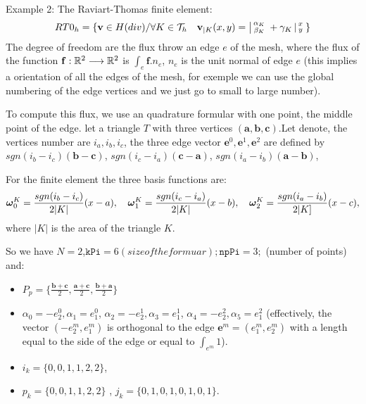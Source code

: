  Example 2: The Raviart-Thomas finite element: 
    \begin{equation}
         RT0_{h} = \{ \mathbf{v} \in H(div) / \forall K \in
         \mathcal{T}_{h} \quad  \mathbf{v}_{|K}(x,y) =
         \left|\begin{smallmatrix} \alpha_{K} \\ \beta_{K} \end{smallmatrix}\right. + \gamma_{K}\left|\begin{smallmatrix} x \\ y \end{smallmatrix}\right.  \}
         \label{eq:RT0-fe}
     \end{equation}
 The degree of freedom are the flux   throw an edge $e$ of the mesh, where the flux of
 the function $\mathbf{f} : \mathbb{R}^2 \longrightarrow \mathbb{R}^2 $ is $\int_{e} \mathbf{f}.n_{e}$,
 $n_{e}$ is the unit normal of edge $e$ (this implies a orientation of all  the edges of the mesh,
 for exemple we can use the global numbering of the edge vertices and we just go to small to large number).
 
 
  To compute this flux, we use an quadrature formular with one point, the middle point
  of the edge. let a triangle $T$ with three vertices $(\mathbf{a},\mathbf{b},\mathbf{c})$.Let denote, the  vertices number are  $i_{a},i_{b},i_{c}$, the three edge vector $\mathbf{e}^{0},\mathbf{e}^{1},\mathbf{e}^{2}$ are 
  defined by $ sgn(i_{b}-i_{c})(\mathbf{b}-\mathbf{c})$, $sgn(i_{c}-i_{a})(\mathbf{c}-\mathbf{a})$, $sgn(i_{a}-i_{b})(\mathbf{a}-\mathbf{b})$, 
  
  For the finite element the three basis functions are:
 $$\boldsymbol{\omega}^{K}_{0}= \frac{sgn(i_{b}-i_{c})}{2|K|}(x-a),\quad
  \boldsymbol{\omega}^{K}_{1}= \frac{sgn(i_{c}-i_{a})}{2|K|}(x-b),\quad
  \boldsymbol{\omega}^{K}_{2}= \frac{sgn(i_{a}-i_{b})}{2|K]}(x-c),$$
   where $|K|$ is the area of the triangle $K$.
   \medskip
  
So we have  $N=2$,$\mathtt{kPi}=6 (size of the formuar); \mathtt{npPi}=3;$ (number of points) and:
\begin{itemize}
\item $P_{p} = \{ \frac{\mathbf{b}+\mathbf{c}}{2},\frac{\mathbf{a}+\mathbf{c}}{2}, \frac{\mathbf{b}+{\mathbf{a}}}{2}\}$

\item 
 $\alpha_{0}= - {e}^{0}_{2}, \alpha_{1}= {e}^{0}_{1}$,  
 $\alpha_{2}= - {e}^{1}_{2}, \alpha_{3}= {e}^{1}_{1}$,   
 $\alpha_{4}= - {e}^{2}_{2}, \alpha_{5}= {e}^{2}_{1}$ (effectively, the vector 
 $ ( -{e}^{m}_{2}, {e}^{m}_{1}) $ is orthogonal to the edge $\mathbf{e}^{m}= (e^m_{1},e^m_{2})$ with 
 a length equal to the side of the edge or equal to  $\int_{e^m} 1$).
\item $i_{k}=\{0,0,1,1,2,2\}$, 
\item $p_{k}=\{0,0,1,1,2,2\}$ ,  $j_{k}=\{0,1,0,1,0,1,0,1\}$.

 

\end{itemize}

